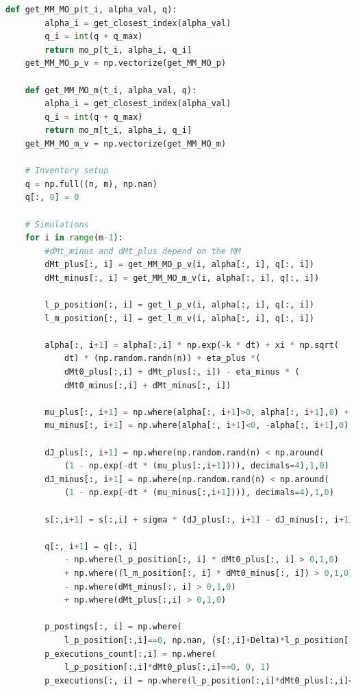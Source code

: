 \documentclass[12pt,a4paper,spanish]{article}%
\begin{document}
\begin{appendices}
\begin{lstlisting}[language=Python]
    def get_MM_MO_p(t_i, alpha_val, q):
        alpha_i = get_closest_index(alpha_val)
        q_i = int(q + q_max)
        return mo_p[t_i, alpha_i, q_i]
    get_MM_MO_p_v = np.vectorize(get_MM_MO_p)
    
    def get_MM_MO_m(t_i, alpha_val, q):
        alpha_i = get_closest_index(alpha_val)
        q_i = int(q + q_max)
        return mo_m[t_i, alpha_i, q_i]
    get_MM_MO_m_v = np.vectorize(get_MM_MO_m)

    # Inventory setup
    q = np.full((n, m), np.nan)
    q[:, 0] = 0

    # Simulations
    for i in range(m-1):
        #dMt_minus and dMt_plus depend on the MM
        dMt_plus[:, i] = get_MM_MO_p_v(i, alpha[:, i], q[:, i])
        dMt_minus[:, i] = get_MM_MO_m_v(i, alpha[:, i], q[:, i])

        l_p_position[:, i] = get_l_p_v(i, alpha[:, i], q[:, i])
        l_m_position[:, i] = get_l_m_v(i, alpha[:, i], q[:, i])

        alpha[:, i+1] = alpha[:,i] * np.exp(-k * dt) + xi * np.sqrt(
        	dt) * (np.random.randn(n)) + eta_plus *(
        	dMt0_plus[:,i] + dMt_plus[:, i]) - eta_minus * (
        	dMt0_minus[:,i] + dMt_minus[:, i])

        mu_plus[:, i+1] = np.where(alpha[:, i+1]>0, alpha[:, i+1],0) + theta
        mu_minus[:, i+1] = np.where(alpha[:, i+1]<0, -alpha[:, i+1],0) + theta

        dJ_plus[:, i+1] = np.where(np.random.rand(n) < np.around(
        	(1 - np.exp(-dt * (mu_plus[:,i+1]))), decimals=4),1,0)
        dJ_minus[:, i+1] = np.where(np.random.rand(n) < np.around(
        	(1 - np.exp(-dt * (mu_minus[:,i+1]))), decimals=4),1,0)
        
        s[:,i+1] = s[:,i] + sigma * (dJ_plus[:, i+1] - dJ_minus[:, i+1])

        q[:, i+1] = q[:, i] 
        	- np.where(l_p_position[:, i] * dMt0_plus[:, i] > 0,1,0) 
        	+ np.where((l_m_position[:, i] * dMt0_minus[:, i]) > 0,1,0)
        	- np.where(dMt_minus[:, i] > 0,1,0) 
        	+ np.where(dMt_plus[:,i] > 0,1,0)

        p_postings[:, i] = np.where(
        	l_p_position[:,i]==0, np.nan, (s[:,i]+Delta)*l_p_position[:,i])
        p_executions_count[:,i] = np.where(
        	l_p_position[:,i]*dMt0_plus[:,i]==0, 0, 1)
        p_executions[:, i] = np.where(l_p_position[:,i]*dMt0_plus[:,i]==0, np.nan, (s[:,i]+Delta)*l_p_position[:,i]*np.where(dMt0_plus[:,i]>0,1,0))
        

\end{lstlisting}
\end{appendices}
\end{document}
